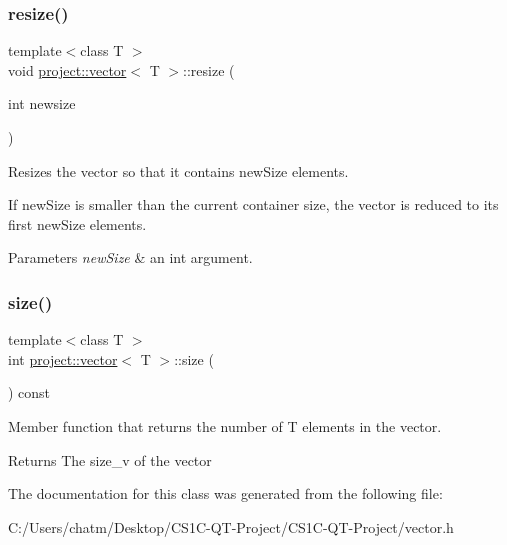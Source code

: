 \subsubsection{\texorpdfstring{resize()}{resize()}}
{\footnotesize\ttfamily template$<$class T $>$ \\
void \mbox{\hyperlink{classproject_1_1vector}{project\+::vector}}$<$ T $>$\+::resize (\begin{DoxyParamCaption}\item[{int}]{newsize }\end{DoxyParamCaption})\hspace{0.3cm}{\ttfamily [inline]}}



Resizes the vector so that it contains new\+Size elements. 

If new\+Size is smaller than the current container size, the vector is reduced to its first new\+Size elements. 
\begin{DoxyParams}{Parameters}
{\em new\+Size} & an int argument. \\
\hline
\end{DoxyParams}
\mbox{\label{classproject_1_1vector_ac7e1b54fa8a66be408bd42cb60840084}} 
\subsubsection{\texorpdfstring{size()}{size()}}
{\footnotesize\ttfamily template$<$class T $>$ \\
int \mbox{\hyperlink{classproject_1_1vector}{project\+::vector}}$<$ T $>$\+::size (\begin{DoxyParamCaption}{ }\end{DoxyParamCaption}) const\hspace{0.3cm}{\ttfamily [inline]}}



Member function that returns the number of T elements in the vector. 

\begin{DoxyReturn}{Returns}
The size\+\_\+v of the vector 
\end{DoxyReturn}


The documentation for this class was generated from the following file\+:\begin{DoxyCompactItemize}
\item 
C\+:/\+Users/chatm/\+Desktop/\+C\+S1\+C-\/\+Q\+T-\/\+Project/\+C\+S1\+C-\/\+Q\+T-\/\+Project/vector.\+h\end{DoxyCompactItemize}
